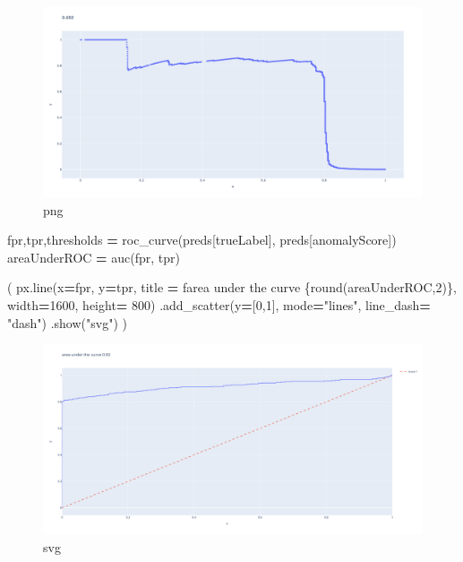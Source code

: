 \documentclass[
]{article}
\newenvironment{Shaded}{\begin{snugshade}}{\end{snugshade}}
\newcommand{\BuiltInTok}[1]{#1}
\newcommand{\DecValTok}[1]{\textcolor[rgb]{0.00,0.00,0.81}{#1}}
\newcommand{\NormalTok}[1]{#1}
\newcommand{\OperatorTok}[1]{\textcolor[rgb]{0.81,0.36,0.00}{\textbf{#1}}}
\newcommand{\SpecialCharTok}[1]{\textcolor[rgb]{0.00,0.00,0.00}{#1}}
\newcommand{\SpecialStringTok}[1]{\textcolor[rgb]{0.31,0.60,0.02}{#1}}
\newcommand{\StringTok}[1]{\textcolor[rgb]{0.31,0.60,0.02}{#1}}
\begin{document}
\begin{figure}
\centering
\includegraphics{mymarkdownfile_files/mymarkdownfile_43_0.png}
\caption{png}
\end{figure}

\begin{Shaded}
\begin{Highlighting}[]
\NormalTok{fpr,tpr,thresholds }\OperatorTok{=}\NormalTok{ roc\_curve(preds[}\StringTok{\textquotesingle{}trueLabel\textquotesingle{}}\NormalTok{], preds[}\StringTok{\textquotesingle{}anomalyScore\textquotesingle{}}\NormalTok{])}
\NormalTok{areaUnderROC }\OperatorTok{=}\NormalTok{ auc(fpr, tpr)}
\end{Highlighting}
\end{Shaded}

\begin{Shaded}
\begin{Highlighting}[]
\NormalTok{(}
\NormalTok{    px.line(x}\OperatorTok{=}\NormalTok{fpr, y}\OperatorTok{=}\NormalTok{tpr, title }\OperatorTok{=} \SpecialStringTok{f\textquotesingle{}area under the curve }\SpecialCharTok{\{}\BuiltInTok{round}\NormalTok{(areaUnderROC,}\DecValTok{2}\NormalTok{)}\SpecialCharTok{\}}\SpecialStringTok{\textquotesingle{}}\NormalTok{, width}\OperatorTok{=}\DecValTok{1600}\NormalTok{, height}\OperatorTok{=} \DecValTok{800}\NormalTok{)}
\NormalTok{    .add\_scatter(y}\OperatorTok{=}\NormalTok{[}\DecValTok{0}\NormalTok{,}\DecValTok{1}\NormalTok{], mode}\OperatorTok{=}\StringTok{"lines"}\NormalTok{, line\_dash}\OperatorTok{=} \StringTok{"dash"}\NormalTok{)    }
\NormalTok{    .show(}\StringTok{"svg"}\NormalTok{)}
\NormalTok{)}
\end{Highlighting}
\end{Shaded}

\begin{figure}
\centering
\includegraphics{mymarkdownfile_files/mymarkdownfile_45_0.svg}
\caption{svg}
\end{figure}
\end{document}
